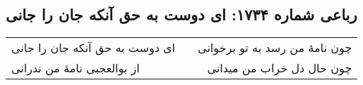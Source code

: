 \begin{center}
\section*{رباعی شماره ۱۷۳۴: ای دوست به حق آنکه جان را جانی}
\label{sec:1734}
\begin{longtable}{l p{0.5cm} r}
ای دوست به حق آنکه جان را جانی
&&
چون نامهٔ من رسد به تو برخوانی
\\
از بوالعجبی نامهٔ من ندرانی
&&
چون حال دل خراب من میدانی
\\
\end{longtable}
\end{center}
